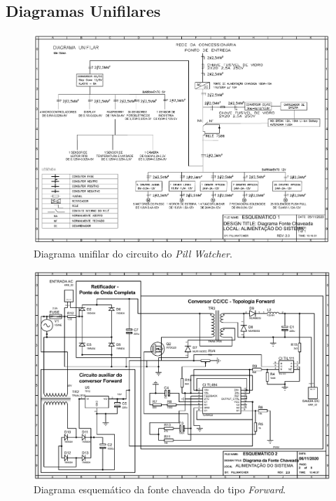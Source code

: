 \begin{apendicesenv}
\begin{enumerate}
\begin{itemize}
\end{itemize}

\end{enumerate}

\begin{landscape}
\section{Diagramas Unifilares}\label{diagramas_energia}
\begin{figure}[!htb]
    \centering
     \includegraphics[width=1.2\textwidth, height=2\textheight,keepaspectratio]{figuras/energia/diagramas/diagrama_unifilar.pdf}
    \caption{Diagrama unifilar do circuito do \textit{Pill Watcher}.}
    \label{fig:diagrama_fonte1}
\end{figure}
\end{landscape}

\begin{landscape}
\begin{figure}[!htb]
    \centering
     \includegraphics[width=1.2\textwidth, height=2\textheight,keepaspectratio]{figuras/energia/diagramas/diagrama_esq_fonte.pdf}
    \caption{Diagrama esquemático da fonte chaveada do tipo \textit{Forward}.}
    \label{fig:diagrama_fonte2}
\end{figure}
\end{landscape}


\end{apendicesenv}
